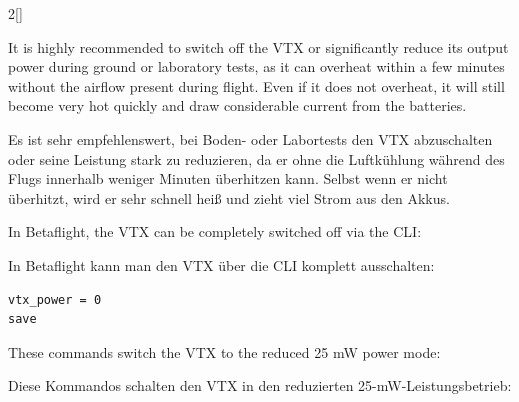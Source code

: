 \begin{paracol}{2}[]
\colende

\renewcommand{\deutschertitel}{Die Leistung des Videosenders reduzieren oder diesen abschalten}
\renewcommand{\englischertitel}{Reduce the Power of the Video Transmitter or Switch It Off}
\makroabschnitt
\label{AbschnittVTXreduzieren}

It is highly recommended to switch off the VTX or significantly reduce its output power during ground or laboratory tests, as it can overheat within a few minutes without the airflow present during flight. Even if it does not overheat, it will still become very hot quickly and draw considerable current from the batteries.

\colger

Es ist sehr empfehlenswert, bei Boden- oder Labortests den VTX abzuschalten oder seine Leistung stark zu reduzieren, da er ohne die Luftkühlung während des Flugs innerhalb weniger Minuten überhitzen kann. Selbst wenn er nicht überhitzt, wird er sehr schnell heiß und zieht viel Strom aus den Akkus.

\coleng

In Betaflight, the VTX can be completely switched off via the CLI:

\colger

In Betaflight kann man den VTX über die CLI komplett ausschalten:

\colende


\begin{lstlisting}[style=shell]
vtx_power = 0
save
\end{lstlisting}

\colstart

These commands switch the VTX to the reduced 25 mW power mode:

\colger

Diese Kommandos schalten den VTX in den reduzierten 25-mW-Leistungsbetrieb:

\colende



\end{paracol}
